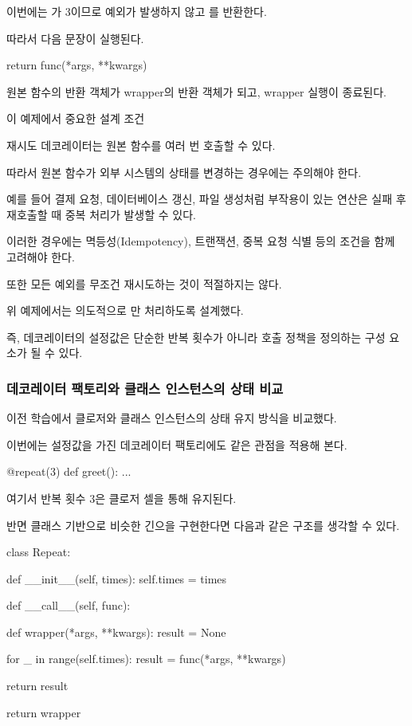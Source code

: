 이번에는 가 3이므로 예외가 발생하지 않고 를 반환한다.

따라서 다음 문장이 실행된다.

\begin{dhkcode}
return func(*args, **kwargs)
\end{dhkcode}

원본 함수의 반환 객체가 wrapper의 반환 객체가 되고, wrapper 실행이 종료된다.

\begin{dhknote}
\begin{dhksmry}[centered]
이 예제에서 중요한 설계 조건
\end{dhksmry}
\end{dhknote}

재시도 데코레이터는 원본 함수를 여러 번 호출할 수 있다.

따라서 원본 함수가 외부 시스템의 상태를 변경하는 경우에는 주의해야 한다.

예를 들어 결제 요청, 데이터베이스 갱신, 파일 생성처럼 부작용이 있는 연산은 실패 후 재호출할 때 중복 처리가 발생할 수 있다.

이러한 경우에는 멱등성(Idempotency), 트랜잭션, 중복 요청 식별 등의 조건을 함께 고려해야 한다.

또한 모든 예외를 무조건 재시도하는 것이 적절하지는 않다.

위 예제에서는 의도적으로 만 처리하도록 설계했다.

즉, 데코레이터의 설정값은 단순한 반복 횟수가 아니라 호출 정책을 정의하는 구성 요소가 될 수 있다.

\subsubsection{데코레이터 팩토리와 클래스 인스턴스의 상태 비교}

이전 학습에서 클로저와 클래스 인스턴스의 상태 유지 방식을 비교했다.

이번에는 설정값을 가진 데코레이터 팩토리에도 같은 관점을 적용해 본다.

\begin{dhkcode}
@repeat(3)
def greet():
    ...
\end{dhkcode}

여기서 반복 횟수 3은 클로저 셀을 통해 유지된다.

반면 클래스 기반으로 비슷한 긴으을 구현한다면 다음과 같은 구조를 생각할 수 있다.

\begin{dhkcode}
class Repeat:

    def __init__(self, times):
        self.times = times

    def __call__(self, func):

        def wrapper(*args, **kwargs):
            result = None

            for _ in range(self.times):
                result = func(*args, **kwargs)

            return result

        return wrapper
\end{dhkcode}

